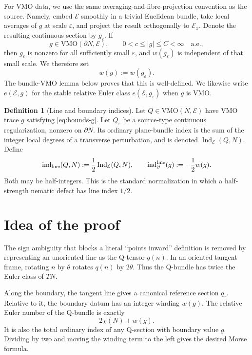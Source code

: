 \documentclass[11pt]{article}
\theoremstyle{definition}
\newtheorem{definition}[theorem]{Definition}
\theoremstyle{remark}
\newcommand{\E}{\mathcal E}
\newcommand{\VMO}{\mathrm{VMO}}
\newcommand{\ind}{\operatorname{ind}}
\newcommand{\Ind}{\operatorname{Ind}}
\newcommand{\bd}{\partial}
\begin{document}
For VMO data, we use the same averaging-and-fibre-projection convention as
the source.  Namely, embed $\E$ smoothly in a trivial Euclidean bundle, take
local averages of $g$ at scale $\varepsilon$, and project the result
orthogonally to $\E_x$.  Denote the resulting continuous section by
$g_\varepsilon$.  If
\begin{equation}\label{eq:bounds-g}
 g\in\VMO(\bd N,\E),\qquad 0<c\le |g|\le C<\infty\quad\text{a.e.},
\end{equation}
then $g_\varepsilon$ is nonzero for all sufficiently small $\varepsilon$, and
$w(g_\varepsilon)$ is independent of that small scale.  We therefore set
\begin{equation}\label{eq:wVMO}
 w(g):=w(g_\varepsilon).
\end{equation}
The bundle-VMO lemma below proves that this is well-defined.  We likewise
write $e(\E,g)$ for the stable relative Euler class
$e(\E,g_\varepsilon)$ when $g$ is VMO.

\begin{definition}[Line and boundary indices]\label{def:indices}
Let $Q\in\VMO(N,\E)$ have VMO trace $g$ satisfying
\eqref{eq:bounds-g}.  Let $Q_\varepsilon$ be a source-type continuous
regularization, nonzero on $\bd N$.  Its ordinary plane-bundle index is the
sum of the integer local degrees of a transverse perturbation, and is denoted
$\Ind_\E(Q,N)$.  Define
\begin{equation}\label{eq:lineindices}
 \ind_{\rm line}(Q,N):=\frac12\Ind_\E(Q,N),
 \qquad
 \ind^{\rm line}_{\bd}(g):=-\frac12w(g).
\end{equation}
Both may be half-integers.  This is the standard normalization in which a
half-strength nematic defect has line index $1/2$.
\end{definition}

\section{Idea of the proof}

The sign ambiguity that blocks a literal ``points inward'' definition is
removed by representing an unoriented line as the Q-tensor $q(n)$.  In an
oriented tangent frame, rotating $n$ by $\theta$ rotates $q(n)$ by
$2\theta$.  Thus the Q-bundle has twice the Euler class of $TN$.

Along the boundary, the tangent line gives a canonical reference section
$q_\tau$.  Relative to it, the boundary datum has an integer winding $w(g)$.
The relative Euler number of the Q-bundle is exactly
\[
  2\chi(N)+w(g).
\]
It is also the total ordinary index of any Q-section with boundary value $g$.
Dividing by two and moving the winding term to the left gives the desired
Morse formula.
\end{document}

